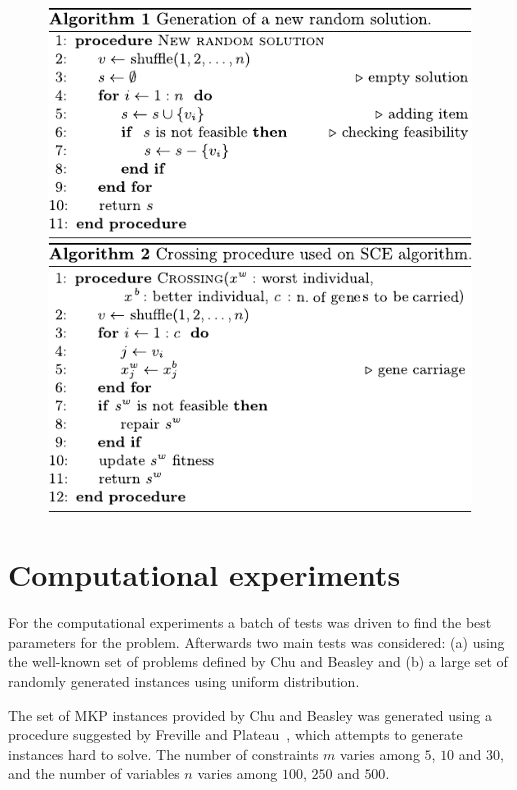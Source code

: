 \documentclass[a0,portrait]{a0poster}
\begin{document}
\begin{multicols}{2}
\begin{figure}
    \includegraphics[scale=2]{alg-new}
	\\[1cm]
    \includegraphics[scale=2]{alg-cross}
  \label{alg:new}
\end{figure}

\section*{Computational experiments}

For the computational experiments a batch of tests was driven to find the best
parameters for the problem.
Afterwards two main tests was considered:
(a) using the well-known set of problems defined by Chu and Beasley \cite{Chu-Beasley-1998}
and (b) a large set of randomly generated instances using uniform distribution.

The set of MKP instances provided by Chu and Beasley was generated using a
procedure suggested by Freville and Plateau~\cite{freville1994efficient}, which
attempts to generate instances hard to solve.
The number of constraints $m$ varies among $5$, $10$ and $30$, and the number
of variables $n$ varies among $100$, $250$ and $500$.


\end{multicols}
\end{document}
